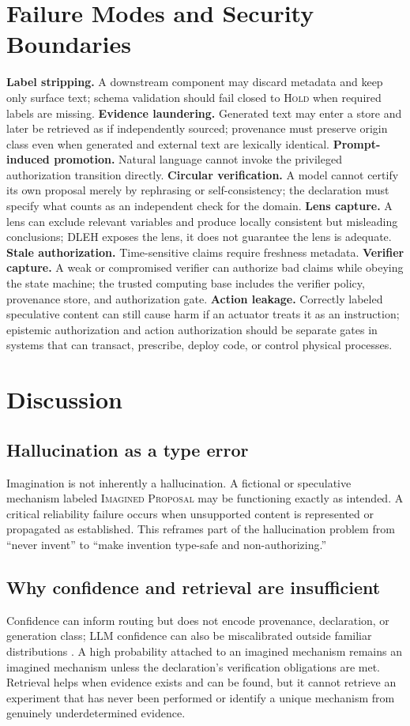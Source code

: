 \documentclass[10pt,twocolumn]{article}
\begin{document}
\section{Failure Modes and Security Boundaries}
\textbf{Label stripping.} A downstream component may discard metadata and keep only surface text; schema validation should fail closed to \textsc{Hold} when required labels are missing. \textbf{Evidence laundering.} Generated text may enter a store and later be retrieved as if independently sourced; provenance must preserve origin class even when generated and external text are lexically identical. \textbf{Prompt-induced promotion.} Natural language cannot invoke the privileged authorization transition directly. \textbf{Circular verification.} A model cannot certify its own proposal merely by rephrasing or self-consistency; the declaration must specify what counts as an independent check for the domain. \textbf{Lens capture.} A lens can exclude relevant variables and produce locally consistent but misleading conclusions; DLEH exposes the lens, it does not guarantee the lens is adequate. \textbf{Stale authorization.} Time-sensitive claims require freshness metadata. \textbf{Verifier capture.} A weak or compromised verifier can authorize bad claims while obeying the state machine; the trusted computing base includes the verifier policy, provenance store, and authorization gate. \textbf{Action leakage.} Correctly labeled speculative content can still cause harm if an actuator treats it as an instruction; epistemic authorization and action authorization should be separate gates in systems that can transact, prescribe, deploy code, or control physical processes.

\section{Discussion}
\subsection{Hallucination as a type error}
Imagination is not inherently a hallucination. A fictional or speculative mechanism labeled \textsc{Imagined Proposal} may be functioning exactly as intended. A critical reliability failure occurs when unsupported content is represented or propagated as established. This reframes part of the hallucination problem from ``never invent'' to ``make invention type-safe and non-authorizing.''

\subsection{Why confidence and retrieval are insufficient}
Confidence can inform routing but does not encode provenance, declaration, or generation class; LLM confidence can also be miscalibrated outside familiar distributions \cite{kadavath2022know}. A high probability attached to an imagined mechanism remains an imagined mechanism unless the declaration's verification obligations are met. Retrieval helps when evidence exists and can be found, but it cannot retrieve an experiment that has never been performed or identify a unique mechanism from genuinely underdetermined evidence.
\end{document}
